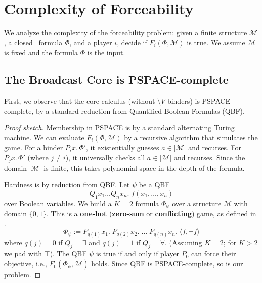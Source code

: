 
\section{Complexity of Forceability}
\label{sec:k-complexity}

We analyze the complexity of the forceability problem:
given a finite structure $\mathcal M$, a closed \KFOL\ formula $\Phi$,
and a player $i$, decide if $F_i(\Phi,\mathcal M)$ is true.
We assume $\mathcal M$ is fixed and the formula $\Phi$ is the input.

\subsection{The Broadcast Core is PSPACE-complete}

First, we observe that the core calculus (without $\setminus V$ binders)
is PSPACE-complete, by a standard reduction from Quantified
Boolean Formulas (QBF).


\begin{proof}[Proof sketch]
Membership in PSPACE is by a standard alternating Turing machine.
We can evaluate $F_i(\Phi, \mathcal{M})$ by a recursive algorithm
that simulates the game.
For a binder $P_i x.\,\Phi'$, it existentially guesses $a \in |\mathcal{M}|$
and recurses. For $P_j x.\,\Phi'$ (where $j \ne i$), it
universally checks all $a \in |\mathcal{M}|$ and recurses.
Since the domain $|\mathcal{M}|$ is finite, this takes polynomial
space in the depth of the formula.

Hardness is by reduction from QBF. Let $\psi$ be a QBF
\[
  Q_1 x_1 \dots Q_n x_n.\; f(x_1, \dots, x_n)
\]
over Boolean variables. We build a $K=2$ formula $\Phi_\psi$
over a structure $\mathcal{M}$ with domain $\{0, 1\}$.
This is a \textbf{one-hot} (\textbf{zero-sum} or \textbf{conflicting}) game,
as defined in .
\[
\Phi_\psi :=
  P_{q(1)} x_1.\;
  P_{q(2)} x_2.\; \dots\;
  P_{q(n)} x_n.\;
  \langle f, \neg f \rangle
\]
where $q(j) = 0$ if $Q_j = \exists$ and $q(j) = 1$ if $Q_j = \forall$.
(Assuming $K=2$; for $K>2$ we pad with $\top$).
The QBF $\psi$ is true if and only if player $P_0$ can
force their objective, i.e., $F_0(\Phi_\psi, \mathcal{M})$ holds.
Since QBF is PSPACE-complete, so is our problem.
\end{proof}

